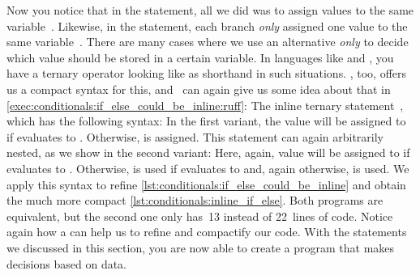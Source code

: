 Now you notice that in the  statement, all we did was to assign values to the same variable~.
Likewise, in the  statement, each branch \emph{only} assigned one value to the same variable~.
There are many cases where we use an alternative \emph{only} to decide which value should be stored in a certain variable.
In languages like  and , you have a ternary operator looking like  as shorthand in such situations.
\python, too, offers us a compact syntax for this, and \ruff\ can again give us some idea about that in \cref{exec:conditionals:if_else_could_be_inline:ruff}:
The inline ternary  statement~\cite{PEP308}, which has the following syntax:%
%
%
%
\FloatBarrier%
%
%
%
%
%
In the first variant, the value  will be assigned to  if  evaluates to .
Otherwise,  is assigned.
This statement can again arbitrarily nested, as we show in the second variant:
Here, again, value  will be assigned to  if  evaluates to .
Otherwise,  is used if  evaluates to  and, again otherwise,  is used.%
%
%
%
We apply this syntax to refine \cref{lst:conditionals:if_else_could_be_inline} and obtain the much more compact \cref{lst:conditionals:inline_if_else}.
Both programs are equivalent, but the second one only has~13 instead of 22~lines of code.
Notice again how a  can help us to refine and compactify our code.%
%
\endhsection%
%
%
With the statements we discussed in this section, you are now able to create a program that makes decisions based on data.

